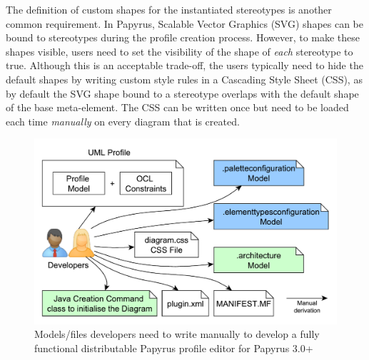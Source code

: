 The definition of custom shapes for the instantiated stereotypes is another common requirement. 
In Papyrus, Scalable Vector Graphics (SVG) shapes can be bound to stereotypes during the profile creation process. 
However, to make these shapes visible, users need to set the visibility of the shape of \textit{each} stereotype to true. 
Although this is an acceptable trade-off, the users typically need to hide the default shapes by writing custom style rules in a Cascading Style Sheet (CSS), as by default the SVG shape bound to a stereotype overlaps with the default shape of the base meta-element.
The CSS can be written once but need to be loaded each time \textit{manually} on every diagram that is created. 

\begin{figure}[ht!]
	\centering
	\includegraphics[width=1\textwidth]{diagrams/neededPapyrusFiles_new.pdf}
	\vspace{-3mm}
	\caption[]{Models/files developers need to write manually to 
		develop a fully functional distributable Papyrus profile editor for Papyrus 3.0+}
	\label{fig:neededPapyrusFiles_new}

\end{figure}


